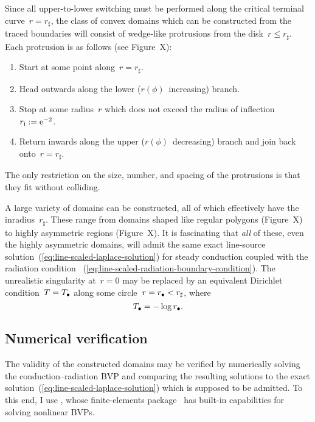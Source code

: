 Since all upper-to-lower switching must be performed
along the critical terminal curve~$r = r_\sharp$,
the class of convex domains which can be constructed
from the traced boundaries
will consist of wedge-like protrusions from the disk~$r \le r_\sharp$.
Each protrusion is as follows (see Figure~X): %
\begin{enumerate}
  \item
    Start at some point along~$r = r_\sharp$.
  \item
    Head outwards along the lower ($r (\phi)$~increasing) branch.
  \item
    Stop at some radius~$r$ which does not exceed
    the radius of inflection~$r_{\mathrm{i}} := \mathrm{e}^{-2}$.
  \item
    Return inwards along the upper ($r (\phi)$~decreasing) branch
    and join back onto~$r = r_\sharp$.
\end{enumerate}
The only restriction on the size, number, and spacing of the protrusions
is that they fit without colliding.

A large variety of domains can be constructed,
all of which effectively have the inradius~$r_\sharp$.
These range from domains shaped like regular polygons
(Figure~X) %
to highly asymmetric regions
(Figure~X). %
It is fascinating that \emph{all} of these,
even the highly asymmetric domains,
will admit the same
exact line-source solution~(\ref{eq:line-scaled-laplace-solution})
for steady conduction coupled with the radiation condition~%
  (\ref{eq:line-scaled-radiation-boundary-condition}).
The unrealistic singularity at~$r = 0$
may be replaced by an equivalent Dirichlet condition~$T = T_\bullet$
along some circle~$r = r_\bullet < r_\sharp$,
where
\begin{equation}
  T_\bullet = -\log r_\bullet.
  \label{eq:line-scaled-equivalent-dirichlet-relation}
\end{equation}

\subsection{Numerical verification}
\label{sec:line.convex.verification}

The validity of the constructed domains may be verified
by numerically solving the conduction--radiation BVP
and comparing the resulting solutions
to the exact solution~(\ref{eq:line-scaled-laplace-solution})
which is supposed to be admitted.
To this end, I use ,
whose finite-elements package~
has built-in capabilities for solving nonlinear BVPs.

